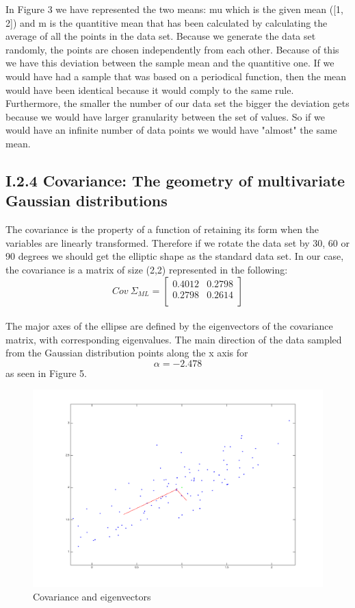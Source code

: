 \documentclass{article}      %
\begin{document}
In Figure 3 we have represented the two means: mu which is the given mean ([1, 2]) and m is the quantitive mean that has been calculated by calculating the average of all the points in the data set. Because we generate the data set randomly, the points are chosen independently from each other. Because of this we have this deviation between the sample mean and the quantitive one. If we would have had a sample that was based on a periodical function, then the mean would have been identical because it would comply to the same rule. Furthermore, the smaller the number of our data set the bigger the deviation gets because we would have larger granularity between the set of values. So if we would have an infinite number of data points we would have "almost" the same mean.\\

\subsection*{I.2.4 Covariance: The geometry of multivariate Gaussian distributions}
The covariance is the property of a function of retaining its form when the variables are linearly transformed. Therefore if we rotate the data set by 30, 60 or 90 degrees we should get the elliptic shape as the standard data set. In our case, the covariance is a matrix of size (2,2) represented in the following:\\

\[
Cov\ \Sigma_{ML}
=
\begin{bmatrix}
    0.4012       & 0.2798  \\
   0.2798       & 0.2614 \\
\end{bmatrix}
\]\\

The major axes of the ellipse are defined by the eigenvectors of the covariance matrix, with corresponding eigenvalues. The main direction of the data sampled from the Gaussian distribution points along the x axis for \[\alpha = -2.478 \] as seen in Figure 5.\\

\begin{figure}[h]
\centering
\includegraphics[scale=.3]{img/i24}
\caption{Covariance and eigenvectors \label{overflow}}
\end{figure}
\end{document}
